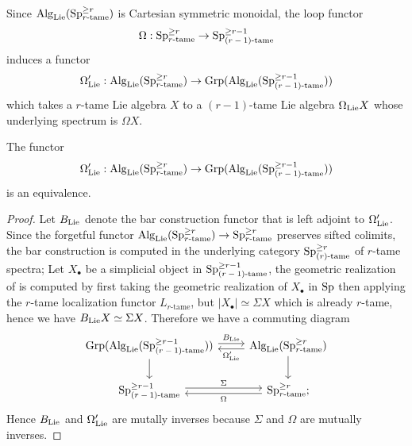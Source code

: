 Since $\operatorname{Alg}_{\operatorname{Lie}}(\operatorname{Sp}^{\geq r}_{\text{$r$-tame}})$ is Cartesian symmetric monoidal, the loop functor 
$$
\Omega: \operatorname{Sp}^{\geq r}_{\text{$r$-tame}}
\to 
\operatorname{Sp}^{\geq r-1}_{\text{$(r-1)$-tame}}
$$
induces a functor
\[
\Omega_{\operatorname{Lie}}':\operatorname{Alg}_{\operatorname{Lie}}(\operatorname{Sp}^{\geq r}_{\text{$r$-tame}}) \to \operatorname{Grp}( \operatorname{Alg}_{\operatorname{Lie}}(\operatorname{Sp}^{\geq r-1}_{\text{$(r-1)$-tame}}) )
\]
which takes a $r$-tame Lie algebra $X$ to a $(r-1)$-tame Lie algebra $\Omega_{\operatorname{Lie}}X$ whose underlying spectrum is $\Omega X$.
\begin{proposition}
	\label{B and Omega are mutally inverses}
	The functor 
	\[
	\Omega_{\operatorname{Lie}}': 
	\operatorname{Alg}_{\operatorname{Lie}}(\operatorname{Sp}^{\geq r}_{\text{$r$-tame}}) \to \operatorname{Grp}( \operatorname{Alg}_{\operatorname{Lie}}(\operatorname{Sp}^{\geq r-1}_{\text{$(r-1)$-tame}}) )
	\]
	is an equivalence.
\end{proposition}
\begin{proof}
	Let $B_{\operatorname{Lie}}$ denote the bar construction functor that is left adjoint to $\Omega_{\operatorname{Lie}}'$. Since the forgetful functor 	
	$\operatorname{Alg}_{\operatorname{Lie}}(\operatorname{Sp}^{\geq r}_{\text{$r$-tame}}) \to \operatorname{Sp}^{\geq r}_{\text{$r$-tame}}$ preserves sifted colimits, the bar construction is computed in the underlying category $\operatorname{Sp}^{\geq r}_{\text{$(r)$-tame}}$ of $r$-tame spectra;
	Let $X_{\bullet}$ be a simplicial object in $\operatorname{Sp}^{\geq r-1}_{\text{$(r-1)$-tame}}$, the geometric realization of is computed by first taking the geometric realization of $X_{\bullet}$ in $\operatorname{Sp}$ then applying the $r$-tame localization functor $L_{\text{$r$-tame}}$, but $|X_{\bullet}|\simeq \Sigma X$ which is already $r$-tame, hence we have $B_{\operatorname{Lie}}X\simeq \Sigma X$.
	Therefore we have a commuting diagram
	\[
	\begin{tikzcd}
		\Grp( \Alg_{\Lie}(\Sp^{\geq r-1}_{\text{$(r-1)$-tame}}) ) & \Alg_{\Lie}(\Sp^{\geq r}_{\text{$r$-tame}})\\
		\Sp^{\geq r-1}_{\text{$(r-1)$-tame}} &
		\Sp^{\geq r}_{\text{$r$-tame}};
		\arrow[from=1-1, to=1-2, "B_{\Lie}", shift left]
		\arrow[from=1-2, to=1-1, "\Omega_{\Lie}'", shift left]
		\arrow[from=1-1, to=2-1]
		\arrow[from=1-2, to=2-2]
		\arrow[from=2-1, to=2-2, "\Sigma", shift left]
		\arrow[from=2-2, to=2-1, "\Omega", shift left]
	\end{tikzcd}
	\]
	Hence $B_{\operatorname{Lie}}$ and $\Omega_{\operatorname{Lie}}'$ are mutally inverses because $\Sigma$ and $\Omega$ are mutually inverses.
\end{proof}

